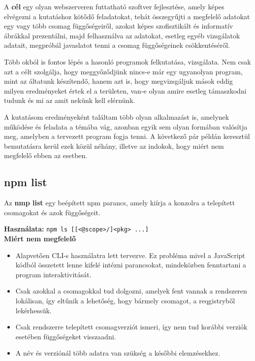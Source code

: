 	A \textbf{cél} egy olyan webszerveren futtatható szoftver fejlesztése, amely képes elvégezni a kutatáshoz kötődő feladatokat, tehát összegyűjti a megfelelő adatokat egy vagy több csomag függőségeiről, azokat képes szofisztikált és informatív ábrákkal prezentálni, majd felhasználva az adatokat, esetleg egyéb vizsgálatok adatait, megpróbál javaslatot tenni a csomag függőségeinek csökkentéséről.
	
	\pagebreak


Több okból is fontos lépés a hasonló programok felkutatása, vizsgálata. Nem csak azt a célt szolgálja, hogy meggyőződjünk nincs-e már egy ugyanolyan program, mint az áltatunk készítendő, hanem azt is, hogy megvizsgáljuk mások eddig milyen eredményeket értek el a területen, van-e olyan amire esetleg támaszkodni tudunk és mi az amit nekünk kell elérnünk.

A kutatásom eredményeként találtam több olyan alkalmazást is, amelynek működése és feladata a témába vág, azonban egyik sem olyan formában valósítja meg, amelyben a tervezett program fogja tenni. A következő pár példán keresztül bemutatásra kerül ezek közül néhány, illetve az indokok, hogy miért nem megfelelő ebben az esetben.

	\subsection{npm list}
	
	Az \textbf{nmp list} egy beépített npm parancs, amely kiírja a konzolra a telepített csomagokat és azok függőségeit.
	
	\textbf{Használata:} \texttt{npm ls [[<@scope>/]<pkg> ...]}\\
	
	\textbf{Miért nem megfelelő}
	\begin{itemize}
		\item Alapvetően CLI-s használatra lett tervezve. Ez probléma mivel a JavaScript kódból összetett lenne kifelé intézni parancsokat, mindeközben fenntartani a program interaktivitását.
		\item Csak azokkal a csomagokkal tud dolgozni, amelyek fent vannak a rendszeren lokálisan, így eltűnik a lehetőség, hogy bármely csomagot, a reqgistryből lekérhessük.
		\item Csak rendszerre telepített csomagverziót ismeri, így nem tud korábbi verziók esetében függőségeket visszaadni.
		\item A név és verziónál több adatra van szükség a későbbi elemzésekhez.
	\end{itemize}
	
